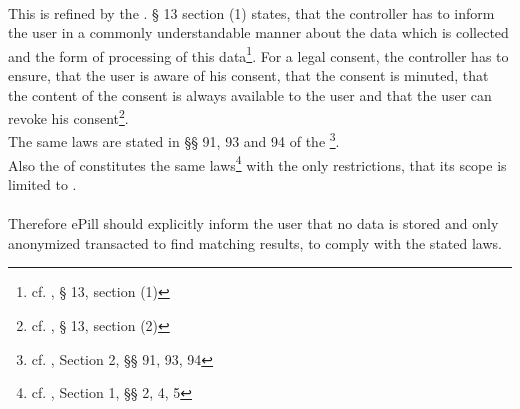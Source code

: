 \\
This is refined by the \TMGns. § 13 section (1) states, that the controller has to inform the user in a commonly understandable manner about the data which is collected and the form of processing of this data\footnote{cf. \cite{BundesregierungderBundesrepublikDeutschland.01.03.2007}, § 13, section (1)}. For a legal consent, the controller has to ensure, that the user is aware of his consent, that the consent is minuted, that the content of the consent is always available to the user and that the user can revoke his consent\footnote{cf. \cite{BundesregierungderBundesrepublikDeutschland.01.03.2007}, § 13, section (2)}.
\\
The same laws are stated in §§ 91, 93 and 94 of the \TKGns\footnote{cf. \cite{BundesregierungderBundesrepublikDeutschland.01.08.1996}, Section 2, §§ 91, 93, 94}.
\\
Also the \DPA of \NRW constitutes the same laws\footnote{cf. \cite{DerInnenministerdesLandesNordrheinWestfalen.09.06.2000}, Section 1, §§ 2, 4, 5} with the only restrictions, that its scope is limited to \NRWns.
\\
\\
Therefore ePill should explicitly inform the user that no data is stored and only anonymized transacted to find matching results, to comply with the stated laws.


